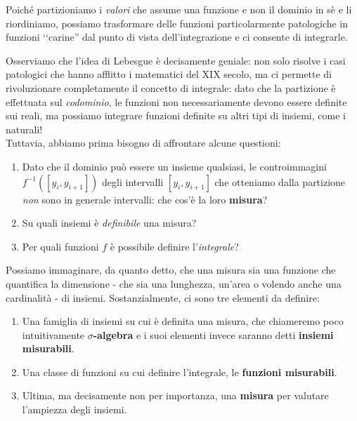 \begin{intuit}
Poiché partizioniamo i \textit{valori} che assume una funzione e non il dominio in sè e li riordiniamo, possiamo trasformare delle funzioni particolarmente patologiche in funzioni ‘‘carine'' dal punto di vista dell'integrazione e ci consente di integrarle.
\end{intuit}
Osserviamo che l'idea di Lebesgue è decisamente geniale: non solo risolve i casi patologici che hanno afflitto i matematici del XIX secolo, ma ci permette di rivoluzionare completamente il concetto di integrale: dato che la partizione è effettuata sul \textit{codominio}, le funzioni non necessariamente devono essere definite sui reali, ma possiamo integrare funzioni definite su altri tipi di insiemi, come i naturali!\\
Tuttavia, abbiamo prima bisogno di affrontare alcune questioni:
\begin{enumerate}
	\item Dato che il dominio può essere un insieme qualsiasi, le controimmagini $f^{-1}\left(\left[y_i,y_{i+1}\right]\right)$ degli intervalli $\left[y_i,y_{i+1}\right]$ che otteniamo dalla partizione \textit{non} sono in generale intervalli: che cos'è la loro \textbf{misura}?
	\item Su quali insiemi è \textit{definibile} una misura?
	\item Per quali funzioni $f$ è possibile definire l'\textit{integrale}?
\end{enumerate}
Possiamo immaginare, da quanto detto, che una misura sia una funzione che quantifica la dimensione - che sia una lunghezza, un'area o volendo anche una cardinalità - di insiemi. Sostanzialmente, ci sono tre elementi da definire:
\begin{enumerate}[label=(\Roman*)]
	\item Una famiglia di insiemi su cui è definita una misura, che chiameremo poco intuitivamente $\sigma$\textbf{-algebra} e i suoi elementi invece saranno detti \textbf{insiemi misurabili}.
	\item Una classe di funzioni su cui definire l’integrale, le \textbf{funzioni misurabili}.
	\item Ultima, ma decisamente non per importanza, una \textbf{misura} per valutare l’ampiezza degli insiemi.
\end{enumerate}
